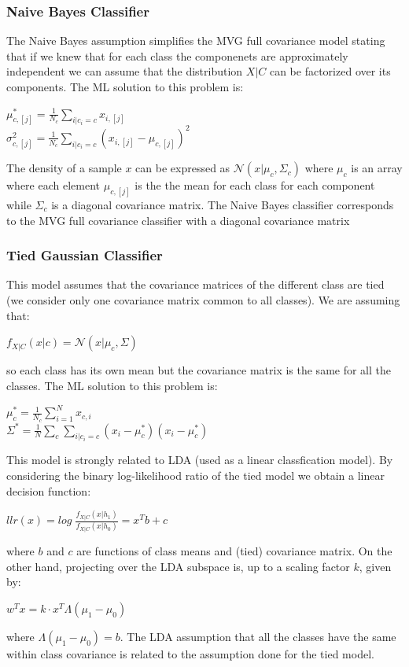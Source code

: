 \documentclass[10pt, a4paper, twocolumn]{article} %
\begin{document}
\subsubsection{Naive Bayes Classifier}
The Naive Bayes assumption simplifies the MVG full covariance model stating that if we knew
that for each class the componenets are approximately independent we can assume that the 
distribution $X|C$ can be factorized over its components. The ML solution to this problem is:
\begin{center}
	$\mu_{c,[j]}^* = \frac{1}{N_c}\sum_{i|c_i=c}^{}x_{i,[j]}$ \\
	$\sigma_{c,[j]}^2 = \frac{1}{N_c}\sum_{i|c_i=c}^{}(x_{i,[j]}-\mu_{c,[j]})^2$
\end{center}
The density of a sample $x$ can be expressed as $\mathcal{N}(x|\mu_c,\Sigma_c)$ where
$\mu_c$ is an array where each element $\mu_{c,[j]}$ is the the mean for each class
for each component while $\Sigma_c$ is a diagonal covariance matrix. The Naive Bayes classifier
corresponds to the MVG full covariance classifier with a diagonal covariance matrix
\subsubsection{Tied Gaussian Classifier}
This model assumes that the covariance matrices of the different class are tied (we consider
only one covariance matrix common to all classes). We are assuming that:
\begin{center}
	$f_{X|C}(x|c) = \mathcal{N} (x|\mu_c, \Sigma)$
\end{center}
so each class has its own mean but the covariance matrix is the same for all the classes. The ML
solution to this problem is:
\begin{center}
	$\mu_{c}^* = \frac{1}{N_c}\sum_{i=1}^{N}x_{c,i}$ \\
	$\Sigma^* = \frac{1}{N}\sum_c{}^{}\sum_{i|c_i=c}^{}(x_{i}-\mu_c^*)(x_{i}-\mu_c^*)$
\end{center}
This model is strongly related to LDA (used as a linear classfication model). By considering 
the binary log-likelihood ratio of the tied model we obtain a linear decision function:
\begin{center}
	$llr(x) = log\;\frac{f_{X|C}(x|h_1)}{f_{X|C}(x|h_0)} = x^Tb + c$ 
\end{center}
where $b$ and $c$ are functions of class means and (tied) covariance matrix. On the other hand,
projecting over the LDA subspace is, up to a scaling factor $k$, given by:
\begin{center}
	$w^Tx = k \cdot x^T\varLambda (\mu_1-\mu_0)$ 
\end{center}
where $\varLambda (\mu_1-\mu_0) = b$. The LDA assumption that all the classes have the same
within class covariance is related to the assumption done for the tied model.\
\end{document}
